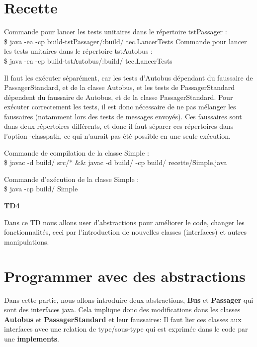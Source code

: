 \documentclass[a4paper,11pt]{article}
\begin{document}
\section*{Recette}
Commande pour lancer les tests unitaires dans le répertoire tstPassager : \\
\$ java -ea -cp build-tstPassager/:build/ tec.LancerTests
Commande pour lancer les tests unitaires dans le répertoire tstAutobus : \\
\$ java -ea -cp build-tstAutobus/:build/ tec.LancerTests

Il faut les exécuter séparément, car les tests d'Autobus dépendant du faussaire de PassagerStandard, et de la classe Autobus, et les tests de PassagerStandard dépendent du faussaire de Autobus, et de la classe PassagerStandard. Pour exécuter correctement les tests, il est donc nécessaire de ne pas mélanger les faussaires (notamment lors des tests de messages envoyés). Ces faussaires sont dans deux répertoires différents, et donc il faut séparer ces répertoires dans l'option -classpath, ce qui n'aurait pas été possible en une seule exécution.

Commande de compilation de la classe Simple :\\
\$ javac -d build/ src/* \&\& javac -d build/ -cp build/ recette/Simple.java

Commande d'exécution de la classe Simple : \\
\$ java -cp build/ Simple

\newpage
\begin{centering}
{\textbf{TD4}}


Dans ce TD nous allons user d'abstractions pour \og améliorer \fg le code, changer les fonctionnalités, ceci par l'introduction
de nouvelles classes (interfaces) et autres manipulations.

\end{centering}

\section{Programmer avec des abstractions}

Dans cette partie, nous allons introduire deux abstractions, \textbf{Bus} et \textbf{Passager} qui sont des interfaces java. Cela implique donc des
modifications dans les classes \textbf{Autobus} et \textbf{PassagerStandard} et leur faussaires: Il faut lier ces classes aux interfaces avec une relation
de type/sous-type qui est exprimée dans le code par une \textbf{implements}.
\end{document}
